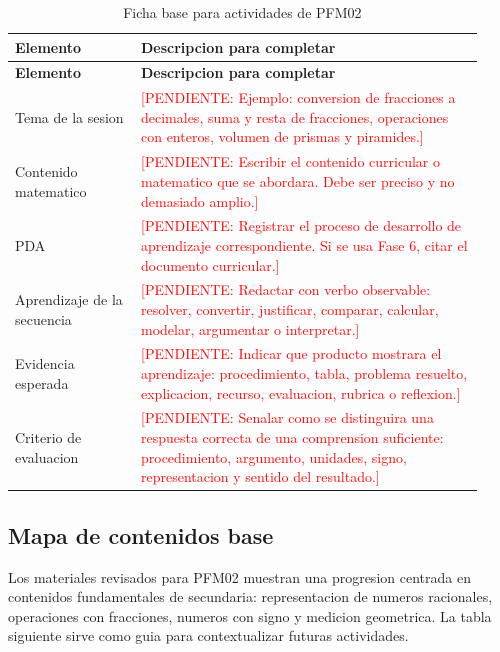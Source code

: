 \documentclass[
	spanish,
	letterpaper, oneside
]{article}
\newcommand{\pendiente}[1]{\textcolor{red}{[PENDIENTE: #1]}}
\begin{document}
\begin{longtable}{@{}p{0.25\linewidth}p{0.68\linewidth}@{}}
	\caption{Ficha base para actividades de PFM02}\label{tab:ficha-pfm02}\\
	\toprule
	\textbf{Elemento} & \textbf{Descripcion para completar} \\
	\midrule
	\endfirsthead
	\toprule
	\textbf{Elemento} & \textbf{Descripcion para completar} \\
	\midrule
	\endhead
	Tema de la sesion & \pendiente{Ejemplo: conversion de fracciones a decimales, suma y resta de fracciones, operaciones con enteros, volumen de prismas y piramides.} \\
	Contenido matematico & \pendiente{Escribir el contenido curricular o matematico que se abordara. Debe ser preciso y no demasiado amplio.} \\
	PDA & \pendiente{Registrar el proceso de desarrollo de aprendizaje correspondiente. Si se usa Fase 6, citar el documento curricular.} \\
	Aprendizaje de la secuencia & \pendiente{Redactar con verbo observable: resolver, convertir, justificar, comparar, calcular, modelar, argumentar o interpretar.} \\
	Evidencia esperada & \pendiente{Indicar que producto mostrara el aprendizaje: procedimiento, tabla, problema resuelto, explicacion, recurso, evaluacion, rubrica o reflexion.} \\
	Criterio de evaluacion & \pendiente{Senalar como se distinguira una respuesta correcta de una comprension suficiente: procedimiento, argumento, unidades, signo, representacion y sentido del resultado.} \\
	\bottomrule
\end{longtable}

\subsection{Mapa de contenidos base}

Los materiales revisados para PFM02 muestran una progresion centrada en
contenidos fundamentales de secundaria: representacion de numeros racionales,
operaciones con fracciones, numeros con signo y medicion geometrica. La tabla
siguiente sirve como guia para contextualizar futuras actividades.
\end{document}
